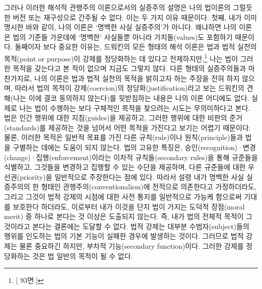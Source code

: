 그러나 이러한 해석적 관행주의 이론으로서의 실증주의 설명은 나의 법이론의
그럴듯한 버전 또는 재구성으로 간주될 수 없다. 이는 두 가지 이유
때문이다. 첫째, 내가 이미 명시한 바와 같이, 나의 이론은 `명백한 사실
실증주의'가 아니다. 왜냐하면 나의 이론은 법의 기준들 가운데에 `명백한'
사실들뿐 아니라 가치들(values)도 포함하기 때문이다. 둘째이자 보다 중요한
이유는, 드워킨의 모든 형태의 해석 이론은 법과 법적 실천의 목적(point or
purpose)이 강제를 정당화하는 데 있다고 전제하지만,\footnote{{[}
  93면.{]}} 나는 법이 그러한 목적을 갖는다고 본 적이 없으며 지금도
그렇지 않다. 다른 형태의 실증주의들과 마찬가지로, 나의 이론은 법과 법적
실천의 목적을 밝히고자 하는 주장을 전혀 하지 않으며, 따라서 법의 목적이
강제(coercion)의 정당화(justification)라고 보는 드워킨의 견해(나는 이에
결코 동의하지 않는다)를 뒷받침하는 내용은 나의 이론 어디에도 없다.
실제로 나는 법이 수행하는 보다 구체적인 목적을 찾으려는 시도는
무의미하다고 본다. 법은 인간 행위에 대한 지침(guides)을 제공하고, 그러한
행위에 대한 비판의 준거(standards)를 제공하는 것을 넘어서 어떤 목적을
가진다고 보기는 어렵기 때문이다. 물론, 이러한 목적은 일반적 목표를 가진
다른 규칙(rule)이나 원칙(principle)들과 법을 구별하는 데에는 도움이 되지
않는다. 법의 고유한 특징은,
승인(recognition)·변경(change)·집행(enforcement)이라는 이차적
규칙들(secondary rules)을 통해 규준들을 식별하고, 그것들을 변경하고
집행할 수 있는 수단을 제공하며, 다른 규준들에 대한 우선권(priority)을
일반적으로 주장한다는 점에 있다. 따라서 설령 내가 명백한 사실 실증주의의
한 형태인 관행주의(conventionalism)에 전적으로 의존한다고 가정하더라도,
그리고 그것이 법적 강제의 시점에 대한 사전 통지를 일반적으로 가능케
함으로써 기대를 보호한다 하더라도, 이로부터 내가 이것을 단지 법이 가지는
도덕적 장점(moral merit) 중 하나로 본다는 것 이상은 도출되지 않는다. 즉,
내가 법의 전체적 목적이 그것이라고 본다는 결론에는 도달할 수 없다. 법적
강제는 대부분 수범자(subject)들의 행위를 인도하는 법의 기본 기능이
실패한 경우에 발생하는 것이다. 그러므로 법적 강제는 물론 중요하긴
하지만, 부차적 기능(secondary function)이다. 그러한 강제를 정당화하는
것은 법 일반의 목적이 될 수 없다.

